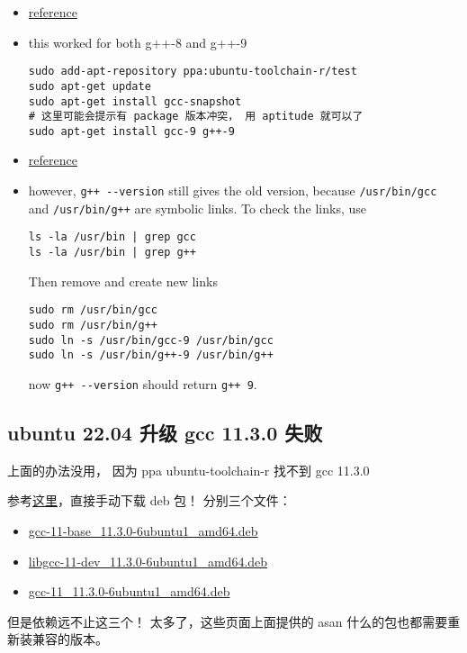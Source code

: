 
\begin{itemize}
\item \href{https://askubuntu.com/questions/815331/updating-to-latest-gcc-and-g-on-ubuntu-16-04}{reference}
\item this worked for both g++-8 and g++-9
\begin{lstlisting}[language=none]
sudo add-apt-repository ppa:ubuntu-toolchain-r/test
sudo apt-get update
sudo apt-get install gcc-snapshot
# 这里可能会提示有 package 版本冲突， 用 aptitude 就可以了
sudo apt-get install gcc-9 g++-9
\end{lstlisting}
\item \href{https://askubuntu.com/questions/26498/how-to-choose-the-default-gcc-and-g-version}{reference}
\item however, \verb`g++ --version` still gives the old version, because \verb`/usr/bin/gcc` and \verb`/usr/bin/g++` are symbolic links. To check the links, use
\begin{lstlisting}[language=none]
ls -la /usr/bin | grep gcc
ls -la /usr/bin | grep g++
\end{lstlisting}
Then remove and create new links
\begin{lstlisting}[language=none]
sudo rm /usr/bin/gcc
sudo rm /usr/bin/g++
sudo ln -s /usr/bin/gcc-9 /usr/bin/gcc
sudo ln -s /usr/bin/g++-9 /usr/bin/g++
\end{lstlisting}
now \verb`g++ --version` should return \verb`g++ 9`.
\end{itemize}

\subsection{ubuntu 22.04 升级 gcc 11.3.0 失败}\label{sub_gccIns_1}
上面的办法没用， 因为 ppa ubuntu-toolchain-r 找不到 gcc 11.3.0

参考\href{https://askubuntu.com/questions/1481354/install-a-specific-gcc-version-to-match-the-version-the-kernel-was-compiled-with}{这里}，直接手动下载 deb 包！ 分别三个文件：
\begin{itemize}
\item \href{http://mirrors.kernel.org/ubuntu/pool/main/g/gcc-11/gcc-11-base_11.3.0-6ubuntu1_amd64.deb}{gcc-11-base_11.3.0-6ubuntu1_amd64.deb}
\item \href{http://mirrors.kernel.org/ubuntu/pool/main/g/gcc-11/libgcc-11-dev_11.3.0-6ubuntu1_amd64.deb}{libgcc-11-dev_11.3.0-6ubuntu1_amd64.deb}
\item \href{http://mirrors.kernel.org/ubuntu/pool/universe/g/gcc-11/gcc-11_11.3.0-6ubuntu1_amd64.deb}{gcc-11_11.3.0-6ubuntu1_amd64.deb}
\end{itemize}

但是依赖远不止这三个！ 太多了，这些页面上面提供的 asan 什么的包也都需要重新装兼容的版本。
